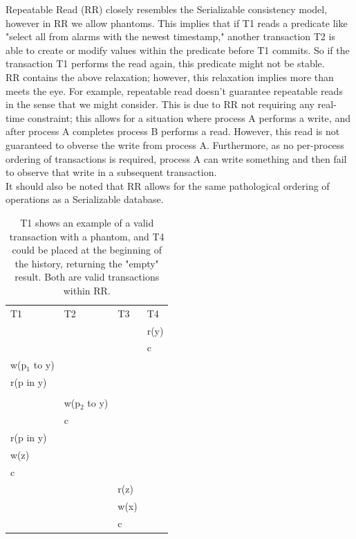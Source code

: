 \documentclass[a4paper,10pt,titlepage]{report}
\begin{document}
    Repeatable Read (RR) closely resembles the Serializable consistency model, however in RR we allow phantoms. This implies that if T1 reads a predicate like "select all from alarms with the newest timestamp," another transaction T2 is able to create or modify values within the predicate before T1 commits. So if the transaction T1 performs the read again, this predicate might not be stable.
\\ \vspace{5mm}
    RR contains the above relaxation; however, this relaxation implies more than meets the eye. For example, repeatable read doesn't guarantee repeatable reads in the sense that we might consider. This is due to RR not requiring any real-time constraint; this allows for a situation where process A performs a write, and after process A completes process B performs a read. However, this read is not guaranteed to obverse the write from process A. Furthermore, as no per-process ordering of transactions is required, process A can write something and then fail to observe that write in a subsequent transaction.
\\ \vspace{5mm}
    It should also be noted that RR allows for the same pathological ordering of operations as a Serializable database.

    \begin{table}[h]
        \begin{tabular}{l|l|l|l}
            T1            & T2            & T3   & T4   \\
            &               &      & r(y) \\
            &               &      & c    \\
            w(p$_1$ to y) &               &      &      \\
            r(p in y)     &               &      &      \\
            &               &      &      \\
            & w(p$_2$ to y) &      &      \\
            & c             &      &      \\
            r(p in y)     &               &      &      \\
            w(z)          &               &      &      \\
            c             &               &      &      \\
            &               & r(z) &      \\
            &               & w(x) &      \\
            &               & c    &
        \end{tabular}
        \caption{T1 shows an example of a valid transaction with a phantom, and T4 could be placed at the beginning of the history, returning the "empty" result. Both are valid transactions within RR.}
    \end{table}
\end{document}
